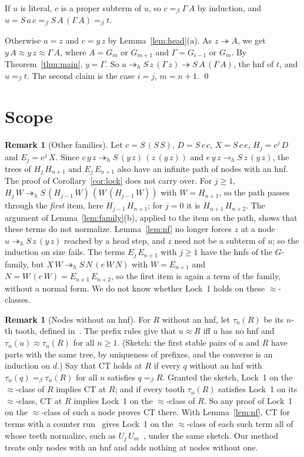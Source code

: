 \documentclass[11pt]{amsart}
\theoremstyle{definition}
\newtheorem{remark}[theorem]{Remark}
\newcommand{\red}{\twoheadrightarrow}
\newcommand{\hred}{\twoheadrightarrow_h}
\newcommand{\hstep}{\to_h}
\newcommand{\conv}{=_\beta}
\begin{document}
If $u$ is literal, $c$ is a proper subterm of $u$, so $c\conv\Gamma\,A$ by induction, and
$u=S\,a\,c\conv S\,A\,(\Gamma\,A)\conv t$.

Otherwise $a=z$ and $c=y\,z$ by Lemma~\ref{lem:head}(a). As $z\red A$, we get
$y\,A\approx y\,z\approx\Gamma\,A$, where $A=G_m$ or $G_{m+1}$ and $\Gamma=G_{i-1}$ or $G_m$. By
Theorem~\ref{thm:main}, $y=\Gamma$. So $u\hred S\,z\,(\Gamma\,z)\red S\,A\,(\Gamma\,A)$, the hnf
of $t$, and $u\conv t$. The second claim is the case $i=j$, $m=n+1$. \qed

\section{Scope}\label{sec:scope}

\begin{remark}[Other families]\label{rem:families}
Let $c=S\,(S\,S)$, $D=S\,c\,c$, $X=S\,c\,e$, $H_j=c^j\,D$ and $E_j=e^j\,X$. Since
$c\,y\,z\hred S\,(y\,z)\,(z\,(y\,z))$ and $e\,y\,z\hstep S\,z\,(y\,z)$, the trees of
$H_j\,H_{n+1}$ and $E_j\,E_{n+1}$ also have an infinite path of nodes with an hnf. The proof of
Corollary~\ref{cor:lock} does not carry over. For $j\ge1$,
$H_j\,W\hred S\,(H_{j-1}\,W)\,(W\,(H_{j-1}\,W))$ with $W=H_{n+1}$, so the path passes through the
\emph{first} item, here $H_{j-1}\,H_{n+1}$; for $j=0$ it is $H_{n+1}\,H_{n+2}$. The argument of
Lemma~\ref{lem:family}(b), applied to the item on the path, shows that these terms do not
normalize. Lemma~\ref{lem:nf} no longer forces $z$ at a node $u\hred S\,z\,(y\,z)$ reached by a
head step, and $z$ need not be a subterm of $u$; so the induction on size fails. The terms
$E_j\,E_{n+1}$ with $j\ge1$ have the hnfs of the $G$-family, but $X\,W\hred S\,N\,(e\,W\,N)$ with
$W=E_{n+1}$ and $N=W\,(e\,W)=E_{n+1}\,E_{n+2}$, so the first item is again a term of the family,
without a normal form. We do not know whether Lock~1 holds on these $\approx$-classes.
\end{remark}

\begin{remark}[Nodes without an hnf]\label{rem:bot}
For $R$ without an hnf, let $\tau_n(R)$ be its $n$-th tooth, defined in~\citep{s11}. The prefix
rules give that $u\approx R$ iff $u$ has no hnf and $\tau_n(u)\approx\tau_n(R)$ for all $n\ge1$.
(Sketch: the first stable pairs of $u$ and $R$ have parts with the same tree, by uniqueness of
prefixes, and the converse is an induction on $d$.) Say that CT holds at $R$ if every $q$ without
an hnf with $\tau_n(q)\conv\tau_n(R)$ for all $n$ satisfies $q\conv R$. Granted the sketch,
Lock~1 on the $\approx$-class of $R$ implies CT at $R$; and if every tooth $\tau_n(R)$ satisfies
Lock~1 on its $\approx$-class, CT at $R$ implies Lock~1 on the $\approx$-class of $R$. So any proof
of Lock~1 on the $\approx$-class of such a node proves CT there. With Lemma~\ref{lem:nf}, CT for
terms with a counter run~\citep[Theorem~2]{s12} gives Lock~1 on the $\approx$-class of each such
term all of whose teeth normalize, such as $U_j\,U_m$~\citep[Corollary~3]{s12}, under the same
sketch. Our method treats only nodes with an hnf and adds nothing at nodes without one.
\end{remark}
\end{document}
